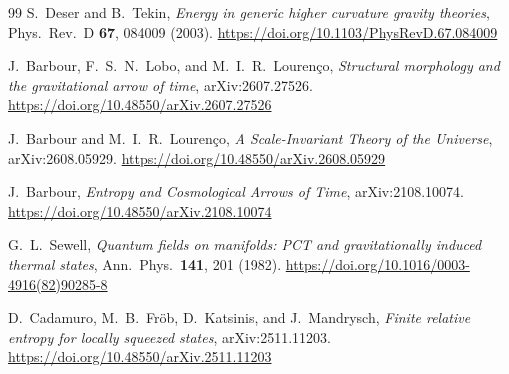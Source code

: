 \documentclass[11pt]{article}
\begin{document}
\begin{thebibliography}{99}
 S.~Deser and B.~Tekin, \emph{Energy in generic higher curvature gravity theories}, Phys.\ Rev.\ D \textbf{67}, 084009 (2003).
\url{https://doi.org/10.1103/PhysRevD.67.084009}

 J.~Barbour, F.~S.~N.~Lobo, and M.~I.~R.~Louren\c{c}o, \emph{Structural morphology and the gravitational arrow of time}, arXiv:2607.27526.
\url{https://doi.org/10.48550/arXiv.2607.27526}

 J.~Barbour and M.~I.~R.~Louren\c{c}o, \emph{A Scale-Invariant Theory of the Universe}, arXiv:2608.05929.
\newline
\url{https://doi.org/10.48550/arXiv.2608.05929}

 J.~Barbour, \emph{Entropy and Cosmological Arrows of Time}, arXiv:2108.10074.
\newline
\url{https://doi.org/10.48550/arXiv.2108.10074}

 G.~L.~Sewell, \emph{Quantum fields on manifolds: PCT and gravitationally induced thermal states}, Ann.\ Phys.\ \textbf{141}, 201 (1982). \url{https://doi.org/10.1016/0003-4916(82)90285-8}

 D.~Cadamuro, M.~B.~Fr\"ob, D.~Katsinis, and J.~Mandrysch, \emph{Finite relative entropy for locally squeezed states}, arXiv:2511.11203.
\url{https://doi.org/10.48550/arXiv.2511.11203}

\end{thebibliography}
\endgroup
\end{document}

